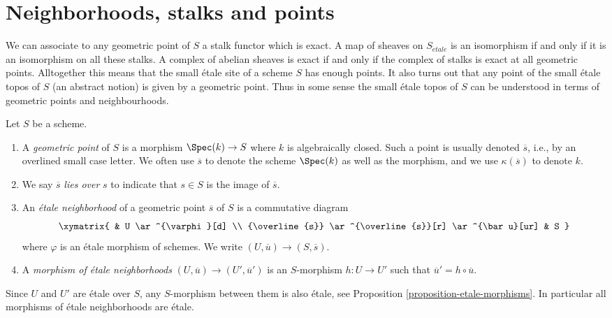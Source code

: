\section{Neighborhoods, stalks and points}
\label{section-stalks}

\noindent
We can associate to any geometric point of $S$ a stalk functor which is
exact. A map of sheaves on $S_{\acute{e}tale}$ is an isomorphism if and only
if it
is an isomorphism on all these stalks. A complex of abelian sheaves is
exact if and only if the complex of stalks is exact at all geometric points.
Alltogether this means that the small \'etale site of a scheme $S$
has enough points. It also turns out that any point of the small \'etale topos
of $S$ (an abstract notion) is given by a geometric point.
Thus in some sense the small \'etale topos of $S$ can be understood in
terms of geometric points and neighbourhoods.

\begin{definition}
\label{definition-geometric-point}
Let $S$ be a scheme.
\begin{enumerate}
\item A {\it geometric point} of $S$ is a morphism
$\Spec(k) \to S$ where $k$ is algebraically closed.
Such a point is usually denoted $\overline{s}$, i.e., by an overlined
small case letter. We often use $\overline{s}$ to denote the scheme
$\Spec(k)$ as well as the morphism, and we use $\kappa(\overline{s})$
to denote $k$.
\item We say $\overline{s}$ {\it lies over} $s$
to indicate that $s \in S$ is the image of $\overline{s}$.
\item An {\it \'etale neighborhood} of a geometric point $\overline{s}$
of $S$ is a commutative diagram
$$
\xymatrix{
& U \ar^{\varphi}[d] \\
{\overline{s}} \ar^{\overline{s}}[r] \ar^{\bar u}[ur] & S
}
$$
where $\varphi$ is an \'etale morphism of schemes.
We write $(U, \overline{u}) \to (S, \overline{s})$.
\item A {\it morphism of \'etale neighborhoods}
$(U, \overline{u}) \to (U', \overline{u}')$
is an $S$-morphism $h: U \to U'$
such that $\overline{u}' = h \circ \overline{u}$.
\end{enumerate}
\end{definition}

\begin{remark}
\label{remark-etale-between-etale}
Since $U$ and $U'$ are \'etale over $S$, any $S$-morphism
between them is also \'etale, see
Proposition \ref{proposition-etale-morphisms}.
In particular all morphisms of \'etale neighborhoods are \'etale.
\end{remark}

